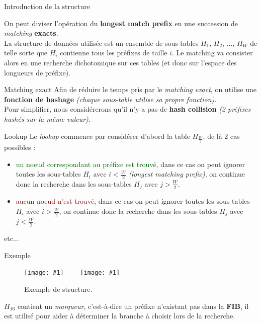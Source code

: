 \documentclass{beamer}
\newcommand{\imageR}[2]{\texttt{[image: \#1]}}
\newcommand{\term}[1]{\textit{\textcolor{maintitle}{#1}}}
\newcommand{\gre}[1]{\textcolor{darkgreen}{#1}}
\newcommand{\red}[1]{\textcolor{darkred}{#1}}
\begin{document}
\begin{frame}{Introduction de la structure}

On peut diviser l'opération du \textbf{longest match prefix} en une succession de \term{matching} \textbf{exacts}. \\
La structure de données utilisée est un ensemble de sous-tables $H_1$, $H_2$, ..., $H_W$ de telle sorte que $H_i$ contienne tous
les préfixes de taille $i$. Le matching va consister alors en une recherche dichotomique sur ces tables (et donc sur l'espace des 
longueurs de préfixe).

\end{frame}

\begin{frame}{Matching exact}
Afin de réduire le temps pris par le \term{matching exact}, on utilise une \textbf{fonction de hashage} \textit{(chaque sous-table 
utilise sa propre fonction)}. \\

Pour simplifier, nous considérerons qu'il n'y a pas de \textbf{hash collision} \textit{(2 préfixes hashés sur la même valeur)}.
\end{frame}

\begin{frame}{Lookup}
Le \term{lookup} commence par considérer d'abord la table $H_{\frac{W}{2}}$, de là 2 cas possibles :
\begin{itemize}
\item \gre{un noeud correspondant au préfixe est trouvé}, dans ce cas on peut ignorer toutes les sous-tables $H_i$ avec $i < 
\frac{W}{2}$ \textit{(longest matching prefix)}, on continue donc la recherche dans les sous-tables $H_j$ avec $j > \frac{W}{2}$.
\item \red{aucun noeud n'est trouvé}, dans ce cas on peut ignorer toutes les sous-tables $H_i$ avec $i > \frac{W}{2}$, on continue 
donc la recherche dans les sous-tables $H_j$ avec $j < \frac{W}{2}$.
\end{itemize}
etc...
\end{frame}

\begin{frame}{Exemple}
\begin{figure}
	\begin{center}
	\imageR{CN_008.png}{50}$\qquad$
	\imageR{CN_007.png}{200}
	\caption{Exemple de structure.}
	\end{center}	
\end{figure}

$H_{16}$ contient un \term{marqueur}, c'est-à-dire un préfixe n'existant pas dans la \textbf{FIB}, il est utilisé pour aider à 
déterminer la branche à choisir lors de la recherche.

\end{frame}
\end{document}
